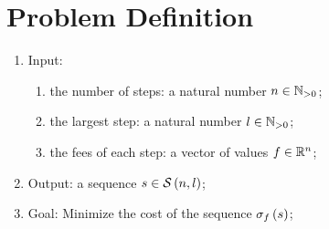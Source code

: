\section{Problem Definition}

\begin{enumerate}
    \item Input:
    \begin{enumerate}
        \item the number of steps: a natural number $n \in \mathbb{N}_{>0}$;
        \item the largest step: a natural number $l \in \mathbb{N}_{>0}$;
        \item the fees of each step: a vector of values $f \in \mathbb{R}^{n}$;
    \end{enumerate}
    \item Output: a sequence $s \in \mathcal{S} \left( n, l \right)$;
    \item Goal: Minimize the cost of the sequence $\sigma_{f} \left( s \right)$;
\end{enumerate}
